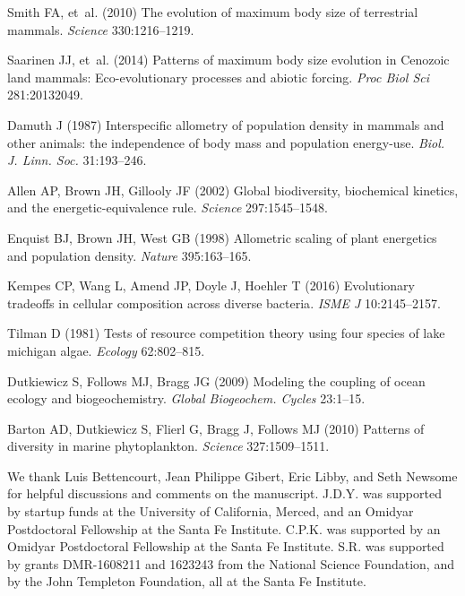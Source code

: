 \documentclass{pnastwo}
\begin{document}
\begin{article}
{\begin{thebibliography}{10}
Smith FA, {et~al.}
\newblock (2010) {The evolution of maximum body size of terrestrial mammals}.
\newblock \emph{Science} 330:1216--1219.

Saarinen JJ, {et~al.}
\newblock (2014) {Patterns of maximum body size evolution in Cenozoic land
  mammals: Eco-evolutionary processes and abiotic forcing}.
\newblock \emph{Proc Biol Sci} 281:20132049.

Damuth J
\newblock (1987) {Interspecific allometry of population density in mammals and
  other animals: the independence of body mass and population energy-use}.
\newblock \emph{Biol. J. Linn. Soc.} 31:193--246.

Allen AP, Brown JH, Gillooly JF
\newblock (2002) {Global biodiversity, biochemical kinetics, and the
  energetic-equivalence rule}.
\newblock \emph{Science} 297:1545--1548.

Enquist BJ, Brown JH, West GB
\newblock (1998) {Allometric scaling of plant energetics and population
  density}.
\newblock \emph{Nature} 395:163--165.

Kempes CP, Wang L, Amend JP, Doyle J, Hoehler T
\newblock (2016) {Evolutionary tradeoffs in cellular composition across diverse
  bacteria}.
\newblock \emph{ISME J} 10:2145--2157.

Tilman D
\newblock (1981) {Tests of resource competition theory using four species of
  lake michigan algae}.
\newblock \emph{Ecology} 62:802--815.

Dutkiewicz S, Follows MJ, Bragg JG
\newblock (2009) {Modeling the coupling of ocean ecology and biogeochemistry}.
\newblock \emph{Global Biogeochem. Cycles} 23:1--15.

Barton AD, Dutkiewicz S, Flierl G, Bragg J, Follows MJ
\newblock (2010) {Patterns of diversity in marine phytoplankton}.
\newblock \emph{Science} 327:1509--1511.

\end{thebibliography}
}


\begin{acknowledgments}
  We thank Luis Bettencourt, Jean Philippe Gibert, Eric Libby, and Seth Newsome for helpful
  discussions and comments on the manuscript.  J.D.Y. was supported by
  startup funds at the University of California, Merced, and an Omidyar
  Postdoctoral Fellowship at the Santa Fe Institute.  C.P.K. was supported by
  an Omidyar Postdoctoral Fellowship at the Santa Fe Institute.  S.R. was
  supported by grants DMR-1608211 and 1623243 from the National Science
  Foundation, and by the John Templeton Foundation, all at the Santa Fe
  Institute.
\end{acknowledgments}






\end{article}
\end{document}
